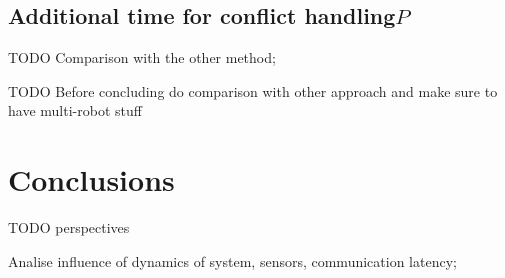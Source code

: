 \documentclass[eprint]{actapoly}
\begin{document}
\subsection{Additional time for conflict handling$P$}


TODO Comparison with the other method;

TODO Before concluding do comparison with other approach and make sure to have 
multi-robot stuff

\section{Conclusions}





TODO perspectives

Analise influence of dynamics of system, sensors, communication latency;



\end{document}
